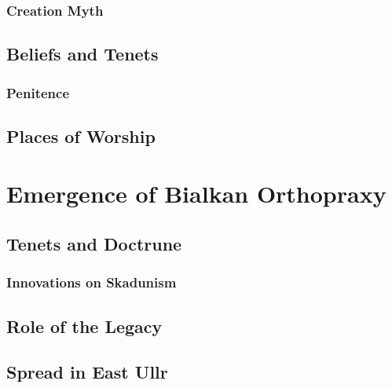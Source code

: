 \subsubsection{Creation Myth}

\subsection{Beliefs and Tenets}

\subsubsection{Penitence}

\subsection{Places of Worship}

\section{Emergence of Bialkan Orthopraxy}

\subsection{Tenets and Doctrune}

\subsubsection{Innovations on Skadunism}

\subsection{Role of the Legacy}

\subsection{Spread in East Ullr}

